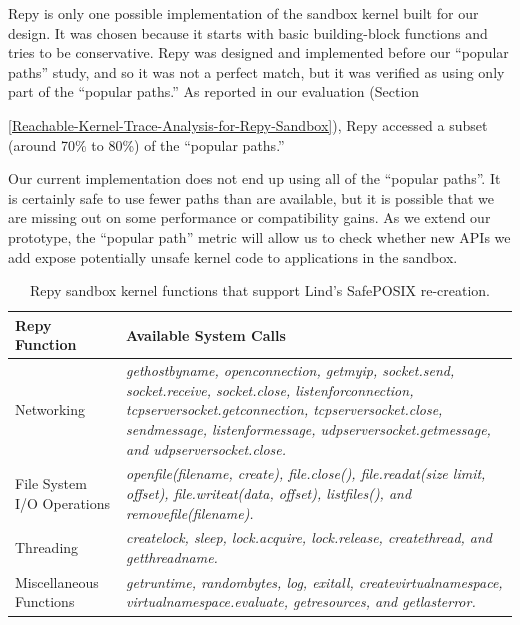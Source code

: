 Repy is only one possible implementation of the sandbox kernel built for our \lip design. 
It was chosen because it starts with basic building-block functions and tries to be conservative. 
Repy was designed and implemented before our ``popular paths'' study, and so it was not a perfect match, 
but it was verified as using only part of the ``popular paths.'' 
As reported in our evaluation (Section~{{\ref{Reachable-Kernel-Trace-Analysis-for-Repy-Sandbox}}), 
Repy accessed a subset (around 70\% to 80\%) of the ``popular paths.'' 

Our current implementation does not end up using all of the ``popular paths''. 
It is certainly safe to use fewer paths than are available, but it is possible that we are missing out on some performance or compatibility gains. 
As we extend our prototype, the ``popular path'' metric will allow us to check whether new APIs we add 
expose potentially unsafe kernel code to applications in the sandbox.

\begin{table}
\centering
  \begin{tabular}{ | p{2.5cm} | p{4.5cm} |}
  \hline
  \textbf{Repy Function} & \textbf{Available System Calls}  \\ \hline

Networking & \emph{gethostbyname, openconnection, getmyip, socket.send, socket.receive, socket.close,
listenforconnection, tcpserversocket.getconnection, tcpserversocket.close, sendmessage, listenformessage,
udpserversocket.getmessage, and udpserversocket.close.} \\ \hline

File System I/O Operations & \emph{openfile(filename, create), file.close(), file.readat(size limit, offset), file.writeat(data, offset),
listfiles(), and removefile(filename).} \\ \hline

Threading & \emph{createlock, sleep, lock.acquire, lock.release, createthread, and getthreadname.} \\ \hline

Miscellaneous Functions & \emph{getruntime, randombytes, log, exitall, createvirtualnamespace,
virtualnamespace.evaluate, getresources, and getlasterror.}  \\ \hline
    \end{tabular}
    \caption{Repy sandbox kernel functions that support Lind's SafePOSIX re-creation.}
    \label{table:RepyKernel}
\end{table}


}
